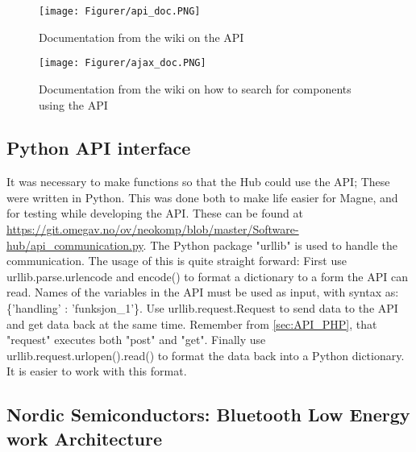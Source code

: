 \begin{figure}
    \centering
     \hspace*{-2cm}
    \texttt{[image: Figurer/api\_doc.PNG]}
    \caption{Documentation from the wiki on the API}
    \label{fig:api_doc}
\end{figure}

\begin{figure}
    \centering
     \hspace*{-2cm}
    \texttt{[image: Figurer/ajax\_doc.PNG]}
    \caption{Documentation from the wiki on how to search for components using the API }
    \label{fig:ajax_doc}
\end{figure}


\subsection{Python API interface} \label{sec:Python_API}
It was necessary to make functions so that the Hub could use the API; These were written in Python. This was done both to make life easier for Magne, and for testing while developing the API. These can be found at \url{https://git.omegav.no/ov/neokomp/blob/master/Software-hub/api_communication.py}. The Python package "urllib" is used to handle the communication. The usage of this is quite straight forward: First use urllib.parse.urlencode and encode() to format a dictionary to a form the API can read. Names of the variables in the API must be used as input, with syntax as: \{'handling' : 'funksjon\_1'\}. Use urllib.request.Request to send data to the API and get data back at the same time. Remember from \cref{sec:API_PHP}, that "request" executes both "post" and "get". Finally use urllib.request.urlopen().read() to format the data back into a Python dictionary. It is easier to work with this format.

\subsection{Nordic Semiconductors: Bluetooth Low Energy work Architecture}
\label{sec:urd_ble}
